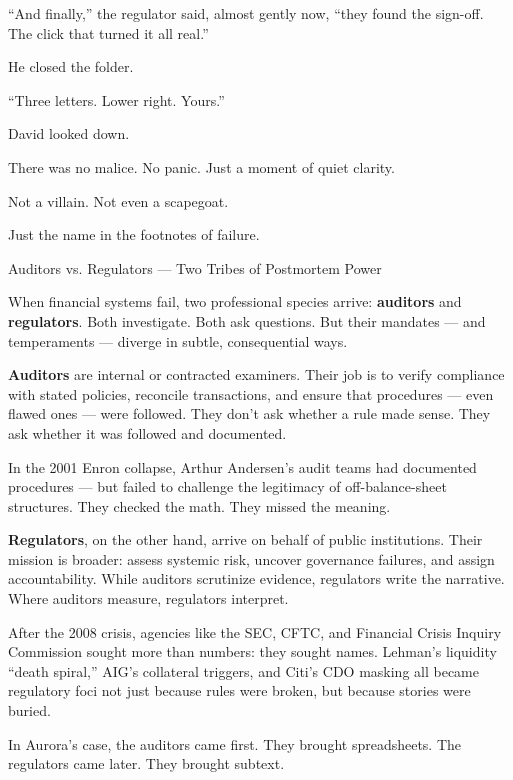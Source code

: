 “And finally,” the regulator said, almost gently now, “they found the sign-off. The click that turned it all real.”

He closed the folder.

“Three letters. Lower right. Yours.”

David looked down.

There was no malice. No panic. Just a moment of quiet clarity.

Not a villain. Not even a scapegoat.

Just the name in the footnotes of failure.

\medskip

\begin{HistoricalSidebar}{Auditors vs. Regulators — Two Tribes of Postmortem Power}

  When financial systems fail, two professional species arrive: \textbf{auditors} and \textbf{regulators}. 
  Both investigate. Both ask questions. But their mandates — and temperaments — diverge in subtle, consequential ways.

  \medskip
  
  \textbf{Auditors} are internal or contracted examiners. Their job is to verify compliance with stated policies, 
  reconcile transactions, and ensure that procedures — even flawed ones — were followed. They don’t ask whether a 
  rule made sense. They ask whether it was followed and documented.

  \medskip
  
  In the 2001 Enron collapse, Arthur Andersen’s audit teams had documented procedures — but failed to challenge 
  the legitimacy of off-balance-sheet structures. They checked the math. They missed the meaning.

  \medskip
  
  \textbf{Regulators}, on the other hand, arrive on behalf of public institutions. Their mission is broader: 
  assess systemic risk, uncover governance failures, and assign accountability. While auditors scrutinize evidence, 
  regulators write the narrative. Where auditors measure, regulators interpret.

  \medskip
  
  After the 2008 crisis, agencies like the SEC, CFTC, and Financial Crisis Inquiry Commission sought more than numbers: 
  they sought names. Lehman’s liquidity “death spiral,” AIG’s collateral triggers, and Citi’s CDO masking all became 
  regulatory foci not just because rules were broken, but because stories were buried.

  \medskip
  
  In Aurora’s case, the auditors came first. They brought spreadsheets.  
  The regulators came later. They brought subtext.
  
\end{HistoricalSidebar}

